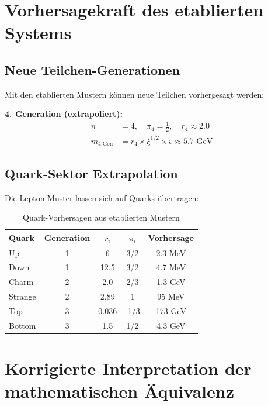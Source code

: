 	\section{Vorhersagekraft des etablierten Systems}
	\label{sec:vorhersagekraft}
	
	\subsection{Neue Teilchen-Generationen}
	\label{subsec:neue_generationen}
	
	Mit den etablierten Mustern können neue Teilchen vorhergesagt werden:
	
	\textbf{4. Generation (extrapoliert):}
	\begin{align}
		n &= 4, \quad \pi_4 = \frac{1}{2}, \quad r_4 \approx 2.0 \\
		m_{\text{4.Gen}} &= r_4 \times \xi^{1/2} \times v \approx 5.7 \text{ GeV}
	\end{align}
	
	\subsection{Quark-Sektor Extrapolation}
	\label{subsec:quark_extrapolation}
	
	Die Lepton-Muster lassen sich auf Quarks übertragen:
	
	\begin{table}[H]
		\centering
		\begin{tabular}{lcccc}
			\toprule
			\textbf{Quark} & \textbf{Generation} & \textbf{$r_i$} & \textbf{$\pi_i$} & \textbf{Vorhersage} \\
			\midrule
			Up & 1 & 6 & 3/2 & 2.3 MeV \\
			Down & 1 & 12.5 & 3/2 & 4.7 MeV \\
			Charm & 2 & 2.0 & 2/3 & 1.3 GeV \\
			Strange & 2 & 2.89 & 1 & 95 MeV \\
			Top & 3 & 0.036 & -1/3 & 173 GeV \\
			Bottom & 3 & 1.5 & 1/2 & 4.3 GeV \\
			\bottomrule
		\end{tabular}
		\caption{Quark-Vorhersagen aus etablierten Mustern}
		\label{tab:quark_vorhersagen}
	\end{table}
	
	\section{Korrigierte Interpretation der mathematischen Äquivalenz}
	\label{sec:korrigierte_interpretation}
	
